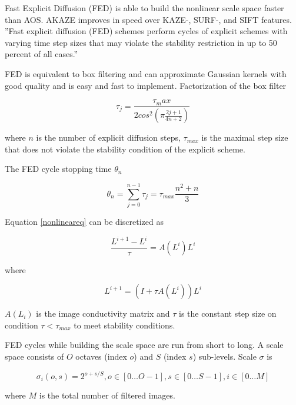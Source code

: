 \documentclass[english,12pt,a4paper,pdftex,elec,utf8]{aaltothesis}
\begin{document}
Fast Explicit Diffusion (FED) is able to build the nonlinear scale space faster than AOS. AKAZE improves in speed over KAZE-, SURF-, and SIFT features. ''Fast explicit diffusion (FED) schemes perform cycles of explicit schemes with varying time step sizes that may violate the stability restriction in up to 50 percent of all cases.''\cite{Grewenig2010}

FED is equivalent to box filtering and can approximate Gaussian kernels with good quality and is easy and fast to implement. Factorization of the box filter

\begin{equation}
  \label{boxfilterfactor}
\tau_j = \frac{\tau_max}{2cos^2\left( \pi \frac{2j+1}{4n+2}\right)}
\end{equation}

where $n$ is the number of explicit diffusion steps, $\tau_{max}$ is the maximal step size that does not violate the stability condition of the explicit scheme.

The FED cycle stopping time $\theta_n$

\begin{equation}
\theta_n = \sum_{j=0}^{n-1}\tau_j=\tau_{max}\frac{n^2+n}{3}
\end{equation}

Equation \ref{nonlineareq} can be discretized as

\begin{equation}
  \label{discretenonlineareq}
\frac{L^{i+1}-L^i}{\tau}=A(L^i)L^i
\end{equation}

where

\begin{equation}
  \label{fednextevolution}
  L^{i+1}=(I + \tau A(L^i))L^i
\end{equation}

$A(L_i)$ is the image conductivity matrix and $\tau$ is the constant step size on condition $\tau < \tau_{max}$ to meet stability conditions.

FED cycles while building the scale space are run from short to long. A scale space consists of $O$ octaves (index $o$) and $S$ (index $s$) sub-levels. Scale $\sigma$ is

\begin{equation}
  \label{scalespace}
  \sigma_i(o,s) = 2^{o+s/S},o \in[0\ldots O-1], s \in [0\ldots S-1], i \in [0 \ldots M]
  \end{equation}

where $M$ is the total number of filtered images.
\end{document}
